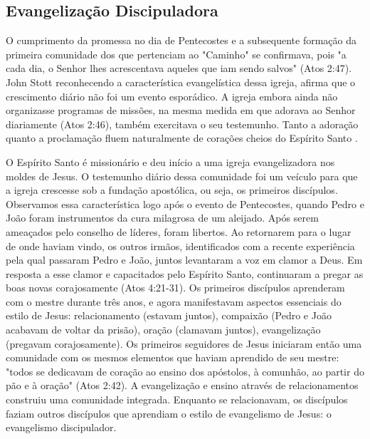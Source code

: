 \documentclass[12pt,openright,oneside,a4paper,
english,french,spanish,brazil]{abntex2}
\begin{document}
\subsection{Evangelização Discipuladora}

O cumprimento da promessa no dia de Pentecostes e a subsequente formação da primeira comunidade dos que pertenciam ao "Caminho" se confirmava, pois "a cada dia, o Senhor lhes acrescentava aqueles que iam sendo salvos" (Atos 2:47). John Stott reconhecendo a característica evangelística dessa igreja, afirma que o crescimento diário não foi um evento esporádico. A igreja embora ainda não organizasse programas de missões, na mesma medida em que adorava ao Senhor diariamente (Atos 2:46), também exercitava o seu testemunho. Tanto a adoração quanto a proclamação fluem naturalmente de corações cheios do Espírito Santo \cite[p. 118,119]{stott}. 

O Espírito Santo é missionário e deu início a uma igreja evangelizadora nos moldes de Jesus. O testemunho diário dessa comunidade foi um veículo para que a igreja crescesse \cite[p. 78]{stott} sob a fundação apostólica, ou seja, os primeiros discípulos. Observamos essa característica logo após o evento de Pentecostes, quando Pedro e João foram instrumentos da  cura milagrosa de um aleijado. Após serem ameaçados pelo conselho de líderes, foram libertos. Ao retornarem para o lugar de onde haviam vindo, os outros irmãos, identificados com a recente experiência pela qual passaram Pedro e João, juntos levantaram a voz em clamor a Deus. Em resposta a esse clamor e capacitados pelo Espírito Santo, continuaram a pregar as boas novas corajosamente (Atos 4:21-31). Os primeiros discípulos aprenderam com o mestre durante três anos, e agora manifestavam aspectos essenciais do estilo de Jesus: relacionamento (estavam juntos), compaixão (Pedro e João acabavam de voltar da prisão), oração (clamavam juntos), evangelização (pregavam corajosamente). Os primeiros seguidores de Jesus iniciaram então uma comunidade com os mesmos elementos que haviam aprendido de seu mestre: "todos se dedicavam de coração ao ensino dos apóstolos, à comunhão, ao partir do pão e à oração" (Atos 2:42). A evangelização e ensino através de relacionamentos construiu uma comunidade integrada. Enquanto se relacionavam, os discípulos faziam outros discípulos que aprendiam o estilo de evangelismo de Jesus: o evangelismo discipulador.

\end{document}
